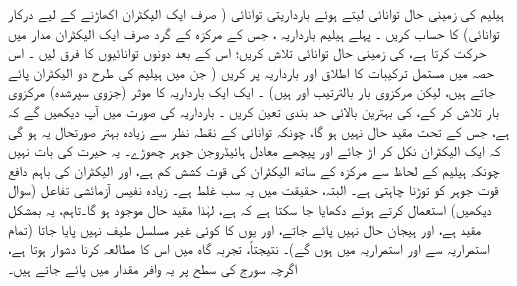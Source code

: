  

ہیلیم کی زمینی حال توانائی    لیتے ہوئے بارداریتی توانائی  ( صرف ایک الیکٹران اکھاڑنے کے لیے درکار توانائی)  کا حساب کریں ۔   پہلے ہیلیم بارداریہ ،   جس کے مرکزہ کے گرد صرف ایک الیکٹران مدار میں حرکت کرتا ہے،  کی زمینی حال توانائی تلاش کریں؛ اس کے بعد دونوں توانائیوں کا فرق لیں ۔
اس حصہ میں مستمل ترکیبات کا اطلاق    اور    بارداریہ  پر کریں ( جن میں ہیلیم کی طرح دو الیکٹران پائے جاتے ہیں، لیکن  مرکزوی بار بالترتیب    اور   ہیں)  ۔  ایک ایک بارداریہ  کا موثر (جزوی سپرشدہ)  مرکزوی بار تلاش کر کے،     کی  بہترین بالائی حد بندی تعین کریں ۔     بارداریہ    کی صورت میں آپ دیکھیں گے کہ     ہے،  جس کے تحت  مقید حال نہیں ہو گا، چونکہ توانائی کے نقطہ نظر سے زیادہ   بہتر صورتحال یہ  ہو گی کہ  ایک الیکٹران نکل کر اڑ جائے اور پیچھے معادل  ہائیڈروجن جوہر چھوڑے۔ یہ حیرت کی بات نہیں چونکہ ہیلیم  کے لحاظ سے مرکزہ کے ساتھ الیکٹران کی قوت کشش کم ہے، اور الیکٹران کی باہم  دافع قوت  جوہر کو توڑنا چاہتی ہے۔     البتہ، حقیقت میں یہ سب غلط ہے۔ زیادہ نفیس  آزمائشی تفاعل (سوال  دیکھیں) استعمال کرتے ہوئے دکھایا جا سکتا ہے کہ  ہے، لہٰذا مقید حال موجود ہو گا۔تاہم،  یہ  بمشکل مقید  ہے، اور ہیجان حال نہیں پائے جاتے، اور یوں  کا کوئی غیر مسلسل طیف نہیں پایا جاتا (تمام  استمراریہ سے اور استمراریہ میں ہوں گے)۔ نتیجتاً، تجربہ گاہ میں اس کا مطالعہ کرنا دشوار ہوتا ہے، اگرچہ سورج کی سطح پر یہ وافر مقدار میں  پائے جاتے ہیں۔


